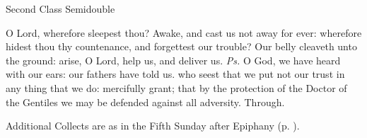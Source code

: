 \begin{inhead}
{Second Class Semidouble}
\end{inhead}
\par\noindent
{}


\introit
{} O Lord, wherefore sleepest thou? Awake, and cast us not away for ever: wherefore hidest thou thy countenance, and forgettest our trouble? Our belly cleaveth unto the ground: arise, O Lord, help us, and deliver us. \textit{Ps.} O God, we have heard with our ears: our fathers have told us.
\vspace{-1ex}
\collect
{} who seest that we put not our trust in any thing that we do: mercifully grant; that by the protection of the Doctor of the Gentiles we may be defended against all adversity. Through.
\begin{rubric}
    Additional Collects are as in the Fifth Sunday after Epiphany (p. \pageref{EpiphanyV}).
\end{rubric}

